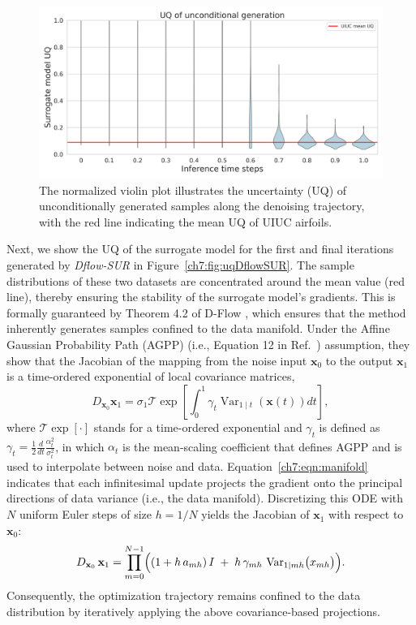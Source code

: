 \begin{figure}[htbp]
    \centering
    \includegraphics[width=1.0\linewidth]{chapter7/fig/UQ_uncondition.png}
    \caption{The normalized violin plot illustrates the uncertainty (UQ) of unconditionally generated samples along the denoising trajectory, with the red line indicating the mean UQ of UIUC airfoils.}
    \label{ch7:fig:uqUnconditional}
\end{figure}

Next, we show the UQ of the surrogate model for the first and final iterations generated by \textit{Dflow-SUR} in Figure~\ref{ch7:fig:uqDflowSUR}. The sample distributions of these two datasets are concentrated around the mean value (red line), thereby ensuring the stability of the surrogate model's gradients. This is formally guaranteed by Theorem 4.2 of D-Flow \cite{ai.BenHamu2024}, which ensures that the method inherently generates samples confined to the data manifold. Under the Affine Gaussian Probability Path (AGPP) (i.e., Equation 12 in Ref.~\cite{ai.Lipman2022}) assumption, they show that the Jacobian of the mapping from the noise input $\mathbf{x}_0$ to the output $\mathbf{x}_1$ is a time-ordered exponential of local covariance matrices,
\begin{equation}
D_{\mathbf{x}_0} \mathbf{x}_1=\sigma_1 \mathcal{T} \exp \left[\int_0^1 \gamma_t \operatorname{Var}_{1 \mid t}(\mathbf{x}(t)) d t\right],
\label{ch7:eqn:manifold}
\end{equation}
where $\mathcal{T} \exp [\cdot]$ stands for a time-ordered exponential and $\gamma_t$ is defined as $\gamma_t=\frac{1}{2} \frac{d}{d t} \frac{\alpha_t^2}{\sigma_t^2}$, in which $\alpha_t$ is the mean-scaling coefficient that defines AGPP and is used to interpolate between noise and data. Equation~\ref{ch7:eqn:manifold} indicates that each infinitesimal update projects the gradient onto the principal directions of data variance (i.e., the data manifold). Discretizing this ODE with \(N\) uniform Euler steps of size \(h = 1/N\) yields the Jacobian of \(\mathbf{x}_1\) with respect to \(\mathbf{x}_0\):
\begin{equation}
D_{\mathbf{x}_0}\,\mathbf{x}_1
= \prod_{m=0}^{N-1}
  \Bigl(
    (1 + h\,a_{m h})\,I
    \;+\;
    h\,\gamma_{m h}\,\operatorname{Var}_{1\mid m h}\bigl(x_{m h}\bigr)
  \Bigr).
\end{equation}
Consequently, the optimization trajectory remains confined to the data distribution by iteratively applying the above covariance‐based projections.


